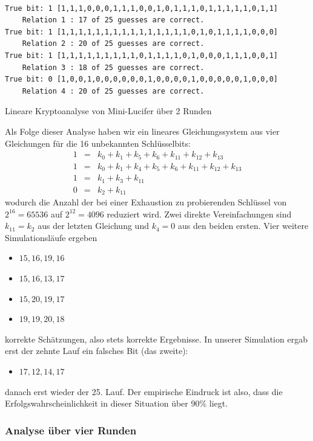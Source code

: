 \begin{refsegment}
\begin{sagecode}
\begin{verbatim}

True bit: 1 [1,1,1,0,0,0,1,1,1,0,0,1,0,1,1,1,0,1,1,1,1,1,0,1,1]
    Relation 1 : 17 of 25 guesses are correct.
True bit: 1 [1,1,1,1,1,1,1,1,1,1,1,1,1,1,1,0,1,0,1,1,1,1,0,0,0]
    Relation 2 : 20 of 25 guesses are correct.
True bit: 1 [1,1,1,1,1,1,1,1,1,0,1,1,1,1,0,1,0,0,0,1,1,1,0,0,1]
    Relation 3 : 18 of 25 guesses are correct.
True bit: 0 [1,0,0,1,0,0,0,0,0,0,1,0,0,0,0,1,0,0,0,0,0,1,0,0,0]
    Relation 4 : 20 of 25 guesses are correct.
\end{verbatim}
\caption{Lineare Kryptoanalyse von Mini-Lucifer über 2 Runden}\label{Sage-code-miniLucRes}
\end{sagecode}
\clearpage

Als Folge dieser Analyse haben wir ein lineares Gleichungssystem aus
vier Gleichungen für die 16 unbekannten Schlüsselbits:
\begin{eqnarray*}
     1 & = & k_0 + k_1 + k_5 + k_6 + k_{11} + k_{12} + k_{13} \\
     1 & = & k_0 + k_1 + k_4 + k_5 + k_6 + k_{11} + k_{12} + k_{13} \\
     1 & = & k_1 + k_3 + k_{11} \\
     0 & = & k_2 + k_{11}
\end{eqnarray*}
wodurch die Anzahl der bei einer Exhaustion zu probierenden Schlüssel von
$2^{16} = 65536$ auf $2^{12} = 4096$ reduziert wird. Zwei direkte
Vereinfachungen sind $k_{11} = k_2$ aus der letzten Gleichung und
$k_4 = 0$ aus den beiden ersten. Vier weitere Simulationsläufe ergeben
\begin{itemize}
   \item $15, 16, 19, 16$
   \item $15, 16, 13, 17$
   \item $15, 20, 19, 17$
   \item $19, 19, 20, 18$
\end{itemize}
korrekte Schätzungen, also stets korrekte Ergebnisse. In unserer Simulation
ergab erst der zehnte Lauf ein falsches Bit (das zweite):
\begin{itemize}
   \item $17, 12, 14, 17$
\end{itemize}
danach erst wieder der 25. Lauf. Der empirische Eindruck ist also, dass
die Erfolgswahrscheinlichkeit in dieser Situation über 90\% liegt.

\subsubsection*{Analyse über vier Runden}


\end{refsegment}
